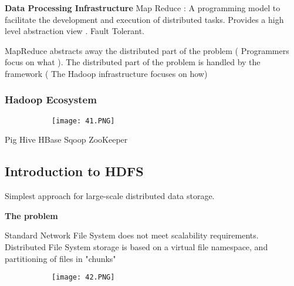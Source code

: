 \documentclass{article}
\begin{document}
\vspace{2mm}
\textbf{Data Processing Infrastructure}
\vspace{2mm}
Map Reduce : A programming model to facilitate the development and execution of distributed tasks. Provides a high level abstraction view . Fault Tolerant.

MapReduce abstracts away the distributed part of the problem ( Programmers focus on what ). The distributed part of the problem is handled by the framework ( The Hadoop infrastructure focuses on how)

\subsubsection{Hadoop Ecosystem}

\begin{figure}[ht!]
  \centering
  \begin{subfigure}[b]{0.35\linewidth}
    \texttt{[image: 41.PNG]}
  \end{subfigure}
\end{figure}


Pig 
Hive 
HBase 
Sqoop 
ZooKeeper 

\subsection{Introduction to HDFS}
Simplest approach for large-scale distributed data storage.

\vspace{3mm}
\textbf{The problem}
\vspace{2mm}

Standard Network File System does not meet scalability requirements.
Distributed File System storage is based on a virtual file namespace, and partitioning of files in "chunks"


\begin{figure}[ht!]
  \centering
  \begin{subfigure}[b]{0.45\linewidth}
    \texttt{[image: 42.PNG]}
  \end{subfigure}
\end{figure}
\end{document}
